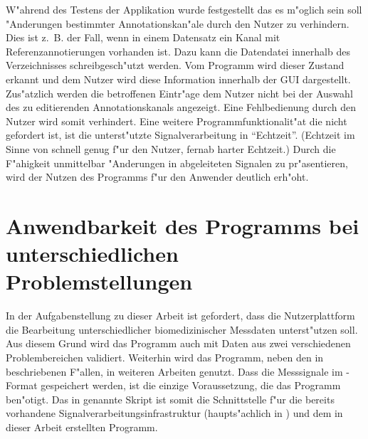 W"ahrend des Testens der Applikation wurde festgestellt das es m"oglich sein soll "Anderungen bestimmter Annotationskan"ale durch den Nutzer zu verhindern.
Dies ist z.~B. der Fall, wenn in einem Datensatz ein Kanal mit Referenzannotierungen vorhanden ist.
Dazu kann die Datendatei innerhalb des Verzeichnisses schreibgesch"utzt werden.
Vom Programm wird dieser Zustand erkannt und dem Nutzer wird diese Information innerhalb der \ac{GUI} dargestellt.
Zus"atzlich werden die betroffenen Eintr"age dem Nutzer nicht bei der Auswahl des zu editierenden Annotationskanals angezeigt.
Eine Fehlbedienung durch den Nutzer wird somit verhindert.
Eine weitere Programmfunktionalit"at die nicht gefordert ist, ist die unterst"utzte Signalverarbeitung in "`Echtzeit"'.
(Echtzeit im Sinne von schnell genug f"ur den Nutzer, fernab harter Echtzeit.)
Durch die F"ahigkeit unmittelbar "Anderungen in abgeleiteten Signalen zu pr"asentieren, wird der Nutzen des Programms f"ur den Anwender deutlich erh"oht.


\section{Anwendbarkeit des Programms bei unterschiedlichen Problemstellungen}

In der Aufgabenstellung zu dieser Arbeit ist gefordert, dass die Nutzerplattform die Bearbeitung unterschiedlicher biomedizinischer Messdaten unterst"utzen soll.
Aus diesem Grund wird das Programm auch mit Daten aus zwei verschiedenen Problembereichen validiert.
Weiterhin wird das Programm, neben den in  beschriebenen F"allen, in weiteren Arbeiten genutzt.
Dass die Messsignale im \usNS-Format gespeichert werden, ist die einzige Voraussetzung, die das Programm ben"otigt.
Das in  genannte Skript ist somit die Schnittstelle f"ur die bereits vorhandene Signalverarbeitungsinfrastruktur (haupts"achlich in \mlNS) und dem in dieser Arbeit erstellten Programm.





